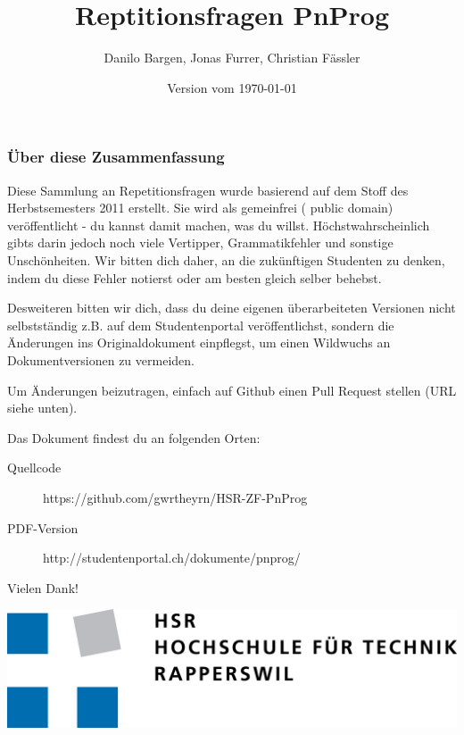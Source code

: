 \documentclass[10pt,a4paper]{scrartcl}
\author{Danilo Bargen, Jonas Furrer, Christian Fässler}
\title{Reptitionsfragen PnProg}
\date{Version vom \today}
\begin{document}
\begin{titlepage}
	\maketitle
	\begin{center}\Huge\ccPublicDomain\end{center}

	\vspace{65mm}

	\subsubsection*{Über diese Zusammenfassung}

	Diese Sammlung an Repetitionsfragen wurde basierend auf dem Stoff des Herbstsemesters 2011 erstellt.
	Sie wird als gemeinfrei ({\ccPublicDomain} public domain) veröffentlicht - du kannst damit machen,
	was du willst. Höchstwahrscheinlich gibts darin jedoch noch viele Vertipper, Grammatikfehler und
	sonstige Unschönheiten. Wir bitten dich daher, an die zukünftigen Studenten zu denken, indem du
	diese Fehler notierst oder am besten gleich selber behebst.

	Desweiteren bitten wir dich, dass du deine eigenen überarbeiteten Versionen nicht selbstständig
	z.B.  auf dem Studentenportal veröffentlichst, sondern die Änderungen ins Originaldokument
	einpflegst, um einen Wildwuchs an Dokumentversionen zu vermeiden.

	Um Änderungen beizutragen, einfach auf Github einen Pull Request stellen (URL siehe unten).

	Das Dokument findest du an folgenden Orten:

	\begin{description}
		\item[Quellcode] https://github.com/gwrtheyrn/HSR-ZF-PnProg
		\item[PDF-Version] http://studentenportal.ch/dokumente/pnprog/
	\end{description}

	Vielen Dank!

	\vspace{10mm}

	\includegraphics{hsr_logo.png}
	\thispagestyle{empty} %
\end{titlepage}
\end{document}

